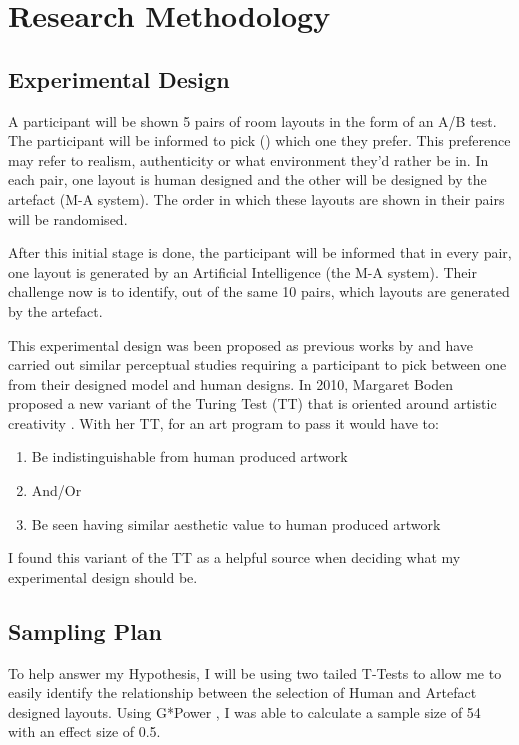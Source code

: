 \section{Research Methodology}


\subsection{Experimental Design}
A participant will be shown 5 pairs of room layouts in the form of an A/B test. The participant will be informed to pick () which one they prefer.
This preference may refer to realism, authenticity or what environment they'd rather be in. In each pair, one layout is human designed and the other will be designed by the artefact (M-A system). The order in which these layouts are shown in their pairs will be randomised.

After this initial stage is done, the participant will be informed that in every pair, one layout is generated by an Artificial Intelligence (the M-A system). Their challenge now is to identify, out of the same 10 pairs, which layouts are generated by the artefact.

This experimental design was been proposed as previous works by  \cite{constrained-layouts} and  \cite{make-it-home} have carried out similar perceptual studies requiring a participant to pick between one from their designed model and human designs. In 2010, Margaret Boden proposed a new variant of the Turing Test (TT) that is oriented around artistic creativity \cite{artistic-tt}. With her TT, for an art program to pass it would have to:
\begin{enumerate}
    \item Be indistinguishable from human produced artwork
    \item[]And/Or
    \item Be seen having similar aesthetic value to human produced artwork
\end{enumerate}
I found this variant of the TT as a helpful source when deciding what my experimental design should be.

\subsection{Sampling Plan}
To help answer my Hypothesis, I will be using two tailed T-Tests to allow me to easily identify the relationship between the selection of Human and Artefact designed layouts.
Using G*Power \cite{gpower}, I was able to calculate a sample size of 54 with an effect size of 0.5. 

